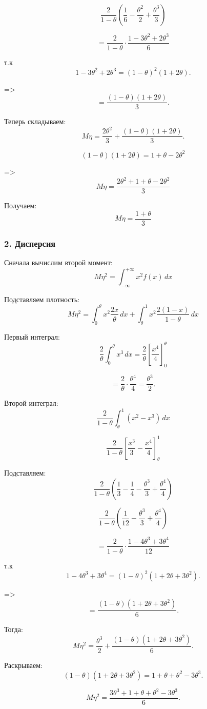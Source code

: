\documentclass[12pt,a4paper]{article}
\theoremstyle{definition}
\begin{document}
\[\frac2{1-\theta}\left(
\frac16-\frac{\theta^2}{2}+\frac{\theta^3}{3}
\right)\]

\[=\frac2{1-\theta}\cdot\frac{1-3\theta^2+2\theta^3}{6}\]

т.к
\[1-3\theta^2+2\theta^3=(1-\theta)^2(1+2\theta).\]

=>
\[=\frac{(1-\theta)(1+2\theta)}{3}.\]

Теперь складываем:
\[M\eta=\frac{2\theta^2}{3}+\frac{(1-\theta)(1+2\theta)}{3}.\]

\[(1-\theta)(1+2\theta)=1+\theta-2\theta^2\]

=>
\[M\eta=\frac{2\theta^2+1+\theta-2\theta^2}{3}\]

Получаем:
\[\boxed{M\eta=\frac{1+\theta}{3}}\]

\subsubsection*{2. Дисперсия}

Сначала вычислим второй момент:
\[M\eta^2=\int_{-\infty}^{+\infty}x^2f(x)\,dx\]

Подставляем плотность:
\[M\eta^2=
\int_0^\theta
x^2\frac{2x}{\theta}\,dx+
\int_\theta^1
x^2\frac{2(1-x)}{1-\theta}\,dx\]

Первый интеграл:
\[
\frac2\theta\int_0^\theta x^3\,dx
=
\frac2\theta\left[\frac{x^4}{4}\right]_0^\theta\]

\[=\frac2\theta\cdot\frac{\theta^4}{4}
=\frac{\theta^3}{2}.\]

Второй интеграл:
\[\frac2{1-\theta}\int_\theta^1(x^2-x^3)\,dx\]

\[\frac2{1-\theta}\left[
\frac{x^3}{3}-\frac{x^4}{4}\right]_\theta^1\]

Подставляем:
\[\frac2{1-\theta}\left(
\frac13-\frac14-\frac{\theta^3}{3}+\frac{\theta^4}{4}\right)\]

\[\frac2{1-\theta}\left(
\frac1{12}-\frac{\theta^3}{3}+\frac{\theta^4}{4}\right)\]

\[=\frac2{1-\theta}\cdot
\frac{1-4\theta^3+3\theta^4}{12}\]

т.к
\[
1-4\theta^3+3\theta^4
=(1-\theta)^2(1+2\theta+3\theta^2).\]

=>
\[=\frac{(1-\theta)(1+2\theta+3\theta^2)}{6}.\]

Тогда:
\[M\eta^2
=
\frac{\theta^3}{2}+\frac{(1-\theta)(1+2\theta+3\theta^2)}{6}.\]

Раскрываем:
\[(1-\theta)(1+2\theta+3\theta^2)=1+\theta+\theta^2-3\theta^3.\]

\[M\eta^2=\frac{3\theta^3+1+\theta+\theta^2-3\theta^3}{6}.\]
\end{document}
